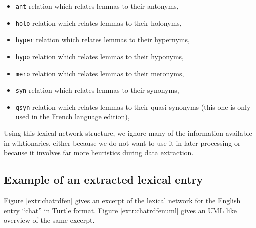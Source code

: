 \documentclass[10pt, a4paper]{article}
\begin{document}
\begin{itemize}
\addtolength{\itemsep}{-0.5\baselineskip}
\item \texttt{ant} relation which relates lemmas to their antonyms,
\item \texttt{holo} relation which relates lemmas to their holonyms,
\item \texttt{hyper} relation which relates lemmas to their hypernyms,
\item \texttt{hypo} relation which relates lemmas to their hyponyms,
\item \texttt{mero} relation which relates lemmas to their meronyms,
\item \texttt{syn} relation which relates lemmas to their synonyms,
\item \texttt{qsyn} relation which relates lemmas to their quasi-synonyms (this one is only used in the French language edition),
\end{itemize}
 
Using this lexical network structure, we ignore many of the information available in wiktionaries, either because we do not want to use it in later processing or because it involves far more heuristics during data extraction.


\subsection{Example of an extracted lexical entry}

Figure \ref{extr:chatrdfen} gives an excerpt of the lexical network for the English entry ``chat'' in Turtle format. Figure \ref{extr:chatrdfenuml} gives an UML like overview of the same excerpt.
\end{document}
